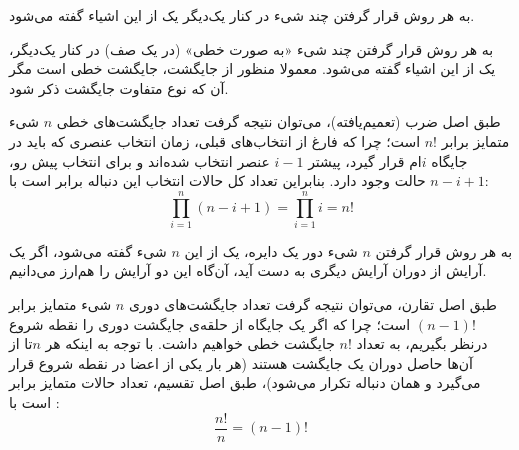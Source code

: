 
\begin{definition}
    به هر روش قرار گرفتن چند شیء در کنار یک‌دیگر یک 
    از این اشیاء گفته می‌شود.
\end{definition}


\begin{definition}
    به هر روش قرار گرفتن چند شیء «به صورت خطی» (در یک صف) در کنار یک‌دیگر، یک
    از این اشیاء گفته می‌شود.
    معمولا منظور از جایگشت، جایگشت خطی است مگر آن که نوع متفاوت جایگشت ذکر شود.
\end{definition}

\begin{fact}
    طبق اصل ضرب (تعمیم‌یافته)، می‌توان نتیجه گرفت
    تعداد جایگشت‌های خطی $n$ شیء متمایز برابر $n!$ است؛
    چرا که فارغ از انتخاب‌های قبلی، زمان انتخاب عنصری که باید در جایگاه
    $i$ام
    قرار گیرد، پیشتر
    $i-1$
    عنصر انتخاب شده‌اند و برای انتخاب پیش رو،
    $n-i+1$
    حالت وجود دارد. بنابراین تعداد کل حالات انتخاب این دنباله برابر است با:
    $$\prod\limits_{i=1}^n (n-i+1) = \prod\limits_{i=1}^n i = n!$$
\end{fact}


\begin{definition}
    به هر روش قرار گرفتن
    $n$
    شیء دور یک دایره، یک 
    از این
    $n$
    شیء
    گفته می‌شود،
    اگر یک آرایش از دوران آرایش دیگری به دست آید، آن‌گاه این دو آرایش را هم‌ارز می‌دانیم.
\end{definition}


\begin{fact}
    طبق اصل تقارن، می‌توان نتیجه گرفت
    تعداد جایگشت‌های دوری $n$ شیء متمایز برابر $(n-1)!$ است؛
    چرا که اگر یک جایگاه از حلقه‌ی جایگشت دوری را نقطه شروع درنظر بگیریم،
    به تعداد
    $n!$
    جایگشت خطی خواهیم داشت.
    با توجه به اینکه هر 
    $n$تا
    از آن‌ها حاصل دوران یک جایگشت هستند
    (هر بار یکی از اعضا در نقطه شروع قرار می‌گیرد و همان دنباله تکرار می‌شود)،
    طبق اصل تقسیم، تعداد حالات متمایز برابر است با :
    $$\frac{n!}{n} = (n-1)!$$
\end{fact}

